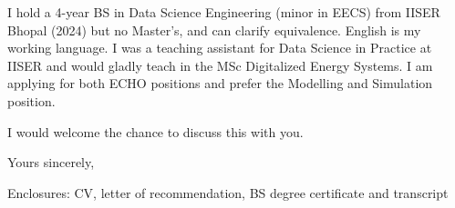 \documentclass[11pt]{article}
\newcommand{\preference}{the Modelling and Simulation position}
\begin{document}
I hold a 4-year BS in Data Science Engineering (minor in EECS) from IISER Bhopal (2024) but no Master's, and can clarify equivalence. English is my working language. I was a teaching assistant for Data Science in Practice at IISER and would gladly teach in the MSc Digitalized Energy Systems. I am applying for both ECHO positions and prefer \preference.

I would welcome the chance to discuss this with you.

Yours sincerely,\\[0.3em]
\myname

{\small\color{soft}Enclosures: CV, letter of recommendation, BS degree certificate and transcript}
\end{document}
